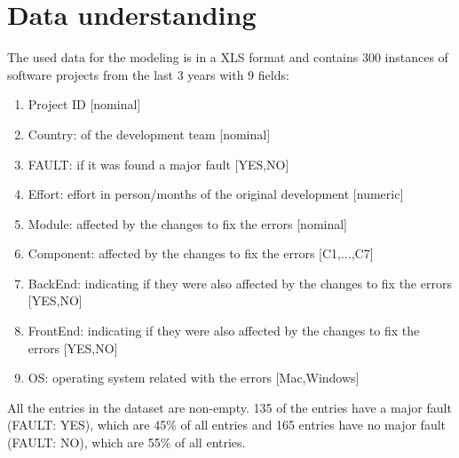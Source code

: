 \chapter{Data understanding}
The used data for the modeling is in a XLS format and contains 300 instances of software projects from the last 3 years with 9 fields:
\begin{enumerate}
	\item Project ID [nominal]
	\item Country: of the development team [nominal]
	\item FAULT: if it was found a major fault [YES,NO]
	\item Effort: effort in person/months of the original development [numeric]
	\item Module: affected by the changes to fix the errors [nominal]
	\item Component: affected by the changes to fix the errors [C1,...,C7]
	\item BackEnd: indicating if they were also affected by the changes to fix the errors [YES,NO]
	\item FrontEnd: indicating if they were also affected by the changes to fix the errors [YES,NO]
	\item OS: operating system related with the errors [Mac,Windows]
\end{enumerate}

All the entries in the dataset are non-empty. 135 of the entries have a major fault (FAULT: YES), which are 45\% of all entries and 165 entries have no major fault (FAULT: NO), which are 55\% of all entries.
